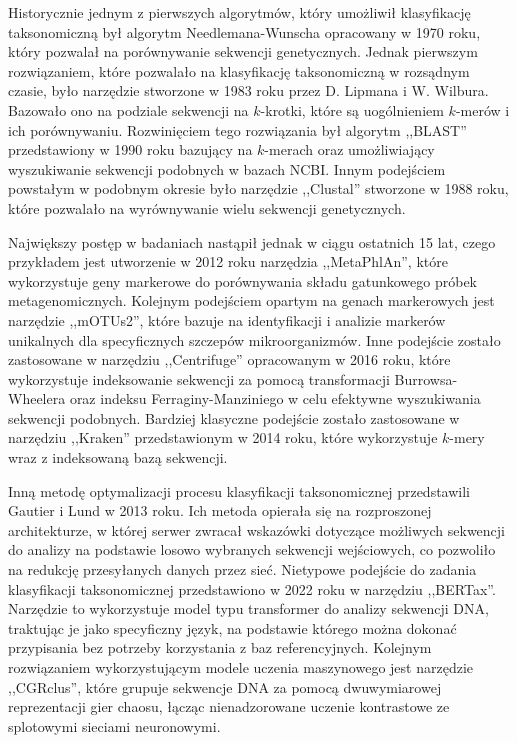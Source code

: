         Historycznie jednym z pierwszych algorytmów, który umożliwił klasyfikację taksonomiczną był algorytm Needlemana-Wunscha\cite{Needleman:1970} opracowany w 1970 roku, który pozwalał na porównywanie sekwencji genetycznych. Jednak pierwszym rozwiązaniem, które pozwalało na klasyfikację taksonomiczną w rozsądnym czasie, było narzędzie stworzone w 1983 roku przez D. Lipmana i W. Wilbura\cite{Wilbur:1983}. Bazowało ono na podziale sekwencji na $k$-krotki, które są uogólnieniem $k$-merów i ich porównywaniu. Rozwinięciem tego rozwiązania był algorytm ,,BLAST'' przedstawiony w 1990 roku\cite{Altschul:1990} bazujący na $k$-merach oraz umożliwiający wyszukiwanie sekwencji podobnych w bazach NCBI. Innym podejściem powstałym w podobnym okresie było narzędzie ,,Clustal''\cite{Higgins:1988} stworzone w 1988 roku, które pozwalało na wyrównywanie wielu sekwencji genetycznych.

        Największy postęp w badaniach nastąpił jednak w ciągu ostatnich 15 lat, czego przykładem jest utworzenie w 2012 roku narzędzia ,,MetaPhlAn''\cite{Segata:2012}, które wykorzystuje geny markerowe do porównywania składu gatunkowego próbek metagenomicznych. Kolejnym podejściem opartym na genach markerowych jest narzędzie ,,mOTUs2''\cite{Milanese:2019}, które bazuje na identyfikacji i analizie markerów unikalnych dla specyficznych szczepów mikroorganizmów. Inne podejście zostało zastosowane w narzędziu ,,Centrifuge''\cite{Kim:2016} opracowanym w 2016 roku, które wykorzystuje indeksowanie sekwencji za pomocą transformacji Burrowsa-Wheelera\cite{Burrows:1994} oraz indeksu Ferraginy-Manziniego\cite{Ferragina:2000} w celu efektywne wyszukiwania sekwencji podobnych. Bardziej klasyczne podejście zostało zastosowane w narzędziu ,,Kraken''\cite{Wood:2014} przedstawionym w 2014 roku, które wykorzystuje $k$-mery wraz z indeksowaną bazą sekwencji.

        Inną metodę optymalizacji procesu klasyfikacji taksonomicznej przedstawili Gautier i Lund w 2013 roku\cite{Gautier:2013}. Ich metoda opierała się na rozproszonej architekturze, w której serwer zwracał wskazówki dotyczące możliwych sekwencji do analizy na podstawie losowo wybranych sekwencji wejściowych, co pozwoliło na redukcję przesyłanych danych przez sieć. Nietypowe podejście do zadania klasyfikacji taksonomicznej przedstawiono w 2022 roku w narzędziu ,,BERTax''\cite{Mock:2022}. Narzędzie to wykorzystuje model typu transformer\cite{Transformers} do analizy sekwencji DNA, traktując je jako specyficzny język, na podstawie którego można dokonać przypisania bez potrzeby korzystania z baz referencyjnych. Kolejnym rozwiązaniem wykorzystującym modele uczenia maszynowego jest narzędzie ,,CGRclus''\cite{Alipour:2024}, które grupuje sekwencje DNA za pomocą dwuwymiarowej reprezentacji gier chaosu, łącząc nienadzorowane uczenie kontrastowe ze splotowymi sieciami neuronowymi.


